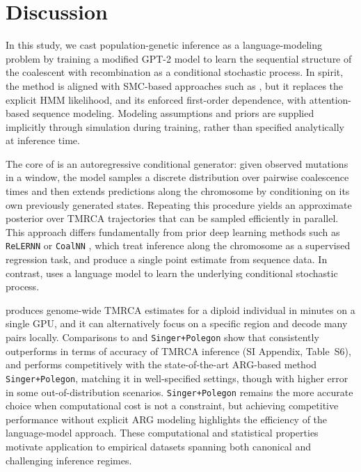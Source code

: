 \documentclass[9pt,twocolumn,twoside]{pnas-new}
\begin{document}
\section*{Discussion}

In this study, we cast population-genetic inference as a language-modeling problem
by training a modified GPT-2 model to learn the sequential structure of the coalescent with recombination
as a conditional stochastic process. 
In spirit, the method is aligned with SMC-based approaches such as \smcpp,
but it replaces the explicit HMM likelihood, and its enforced first-order dependence, with attention-based sequence modeling.
Modeling assumptions and priors are supplied implicitly through simulation during training, rather than specified analytically at inference time.

The core of \cxtkit is an autoregressive conditional generator:
given observed mutations in a window, the model samples a discrete distribution over pairwise coalescence times 
and then extends predictions along the chromosome by conditioning on its own previously generated states.
Repeating this procedure yields an approximate posterior over TMRCA trajectories
that can be sampled efficiently in parallel.
This approach differs fundamentally from prior deep learning methods such as \texttt{ReLERNN} \cite{adrion2020predicting} or \texttt{CoalNN} \cite{nait_saada_inference_2023}, which treat inference along the chromosome as a supervised regression task, and produce a single point estimate from sequence data.
In contrast, \cxtkit uses a language model to learn the underlying conditional stochastic process.

\cxtkit produces genome-wide TMRCA estimates for a diploid individual in minutes on a single GPU,
and it can alternatively focus on a specific region and decode many pairs locally.
Comparisons to \smcpp and \texttt{Singer+Polegon} show that \cxtkit
consistently outperforms \smcpp in terms of accuracy of TMRCA inference (SI Appendix, Table~S6), and performs competitively with the state-of-the-art
ARG-based method \texttt{Singer+Polegon}, matching it in well-specified settings,
though with higher error in some out-of-distribution scenarios.
\texttt{Singer+Polegon} remains the more accurate choice when computational cost is not a constraint,
but achieving competitive performance without explicit ARG modeling highlights the efficiency of the language-model approach.
These computational and statistical properties motivate application to empirical datasets spanning both canonical and challenging inference regimes.
\end{document}
